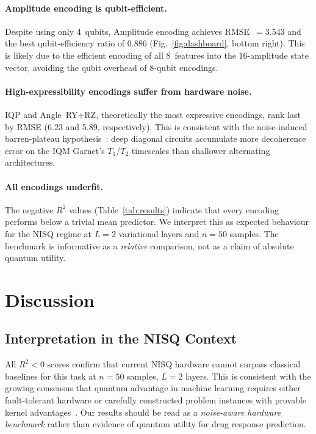 \documentclass[twocolumn,aps,pra,superscriptaddress,floatfix]{revtex4-2}
\begin{document}
\paragraph{Amplitude encoding is qubit-efficient.}
Despite using only 4~qubits, Amplitude encoding achieves RMSE~$= 3.543$
and the best qubit-efficiency ratio of $0.886$ (Fig.~\ref{fig:dashboard},
bottom right).
This is likely due to the efficient encoding of all 8~features into the
16-amplitude state vector, avoiding the qubit overhead of 8-qubit encodings.

\paragraph{High-expressibility encodings suffer from hardware noise.}
IQP and Angle~RY+RZ, theoretically the most expressive encodings, rank last
by RMSE (6.23 and 5.89, respectively).
This is consistent with the noise-induced barren-plateau
hypothesis~\cite{wang2021noise}: deep diagonal circuits accumulate more
decoherence error on the IQM Garnet's $T_1$/$T_2$ timescales than shallower
alternating architectures.

\paragraph{All encodings underfit.}
The negative $R^2$ values (Table~\ref{tab:results}) indicate that every
encoding performs below a trivial mean predictor.
We interpret this as expected behaviour for the NISQ regime at $L=2$
variational layers and $n=50$ samples.
The benchmark is informative as a \emph{relative} comparison, not as a claim
of absolute quantum utility.

\section{Discussion}
\label{sec:discussion}

\subsection{Interpretation in the NISQ Context}

All $R^2 < 0$ scores confirm that current NISQ hardware cannot surpass
classical baselines for this task at $n=50$ samples, $L=2$ layers.
This is consistent with the growing consensus that quantum advantage in
machine learning requires either fault-tolerant hardware or carefully
constructed problem instances with provable kernel
advantages~\cite{huang2021,liu2021,schuld2022}.
Our results should be read as a \emph{noise-aware hardware benchmark} rather
than evidence of quantum utility for drug response prediction.
\end{document}
